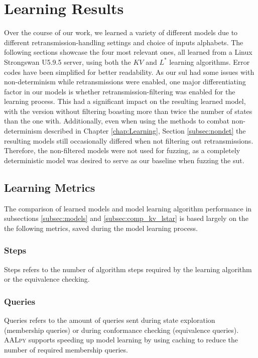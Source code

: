 \section{Learning Results} \label{sec:learnresults}
Over the course of our work, we learned a variety of different models due to different retransmission-handling settings and choice of inputs alphabets. The following sections showcase the four most relevant ones, all learned from a Linux Strongswan U5.9.5 server, using both the $KV$ and $L^*$ learning algorithms. Error codes have been simplified for better readability. As our \ac{sul} had some issues with non-determinism while retransmissions were enabled, one major differentiating factor in our models is whether retransmission-filtering was enabled for the learning process. This had a significant impact on the resulting learned model, with the version without filtering boasting more than twice the number of states than the one with. Additionally, even when using the methods to combat non-determinism described in Chapter \ref{chap:Learning}, Section \ref{subsec:nondet} the resulting models still occasionally differed when not filtering out retransmissions. Therefore, the non-filtered models were not used for fuzzing, as a completely deterministic model was desired to serve as our baseline when fuzzing the \ac{sut}.

\subsection{Learning Metrics} \label{subsec:metrics}
The comparison of learned models and model learning algorithm performance in subsections \ref{subsec:models} and \ref{subsec:comp_kv_lstar} is based largely on the the following metrics, saved during the model learning process.

\subsubsection*{Steps}
Steps refers to the number of algorithm steps required by the learning algorithm or the equivalence checking.

\subsubsection*{Queries}
Queries refers to the amount of queries sent during state exploration (membership queries) or during conformance checking (equivalence queries). \textsc{AALpy} supports speeding up model learning by using caching to reduce the number of required membership queries. 

